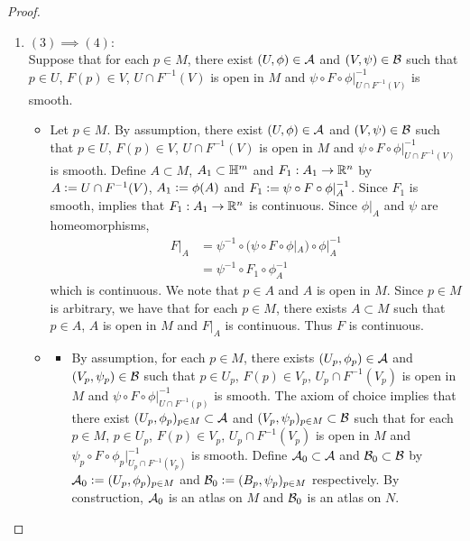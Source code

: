 \documentclass{book}
\begin{document}
\begin{proof}
\begin{enumerate}
		\item $(3) \implies (4)$: \\
		Suppose that for each $p \in M$, there exist $(U, \phi) \in \mathcal{A}$ and $(V, \psi) \in \mathcal{B}$ such that $p \in U$, $F(p) \in V$, $U \cap F^{-1}(V)$ is open in $M$ and $\psi \circ F \circ \phi|_{U \cap F^{-1}(V)}^{-1}$ is smooth. 
		\begin{itemize}
			\item Let $p \in M$. By assumption, there exist $(U, \phi) \in \mathcal{A}$ and $(V, \psi) \in \mathcal{B}$ such that $p \in U$, $F(p) \in V$, $U \cap F^{-1}(V)$ is open in $M$ and $\psi \circ F \circ \phi|_{U \cap F^{-1}(V)}^{-1}$ is smooth. Define $A \subset M$, $A_1 \subset \mathbb{H}^m$ and $F_1: A_1 \rightarrow \mathbb{R}^n$ by $A \vcentcolon= U \cap F^{-1}(V)$, $A_1 \vcentcolon= \phi(A)$ and $F_1 \vcentcolon= \psi \circ F \circ \phi|_{A}^{-1}$. Since $F_1$ is smooth,  implies that $F_1:A_1 \rightarrow \mathbb{R}^n$ is continuous. Since $\phi|_{A}$ and $\psi$ are homeomorphisms, 
			\begin{align*}
				F|_A
				& = \psi^{-1} \circ (\psi \circ F \circ \phi|_A ) \circ \phi|_A^{-1} \\
				& = \psi^{-1} \circ F_1 \circ \phi_{A}^{-1} 
			\end{align*}
			which is continuous. We note that $p \in A$ and $A$ is open in $M$. Since $p \in M$ is arbitrary, we have that for each $p \in M$, there exists $A \subset M$ such that $p \in A$, $A$ is open in $M$ and $F|_A$ is continuous. Thus $F$ is continuous.  
			\item 
			\begin{itemize}
				\item By assumption, for each $p \in M$, there exists $(U_p, \phi_p) \in \mathcal{A}$ and $(V_p, \psi_p) \in \mathcal{B}$ such that $p \in U_p$, $F(p) \in V_p$, $U_p \cap F^{-1}(V_p)$ is open in $M$ and $\psi \circ F \circ \phi|_{U \cap F^{-1}(p)}^{-1}$ is smooth. The axiom of choice implies that there exist $(U_p, \phi_p)_{p \in M} \subset \mathcal{A}$ and $(V_p, \psi_p)_{p \in M} \subset \mathcal{B}$ such that for each $p \in M$, $p \in U_p$, $F(p) \in V_p$, $U_p \cap F^{-1}(V_p)$ is open in $M$ and $\psi_p \circ F \circ \phi_p|_{U_p \cap F^{-1}(V_p)}^{-1}$ is smooth. Define $\mathcal{A}_0 \subset \mathcal{A}$ and $\mathcal{B}_0 \subset \mathcal{B}$ by $\mathcal{A}_0 \vcentcolon= (U_p, \phi_p)_{p \in M}$ and $\mathcal{B}_0 \vcentcolon= (B_p, \psi_p)_{p \in M}$ respectively. By construction, $\mathcal{A}_0$ is an atlas on $M$ and $\mathcal{B}_0$ is an atlas on $N$.

\end{itemize}
\end{itemize}
\end{enumerate}
\end{proof}
\end{document}
